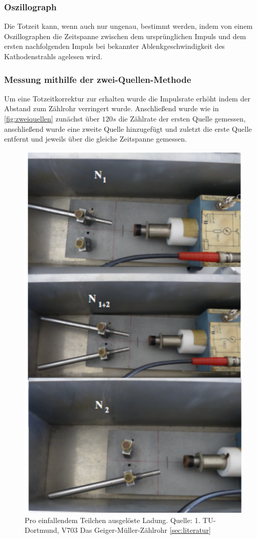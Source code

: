 \subsubsection{Oszillograph}
Die Totzeit kann, wenn auch nur ungenau, bestimmt werden, indem von einem Oszillographen die Zeitspanne 
zwischen dem ursprünglichen Impuls und dem ersten nachfolgenden Impuls bei bekannter Ablenkgeschwindigkeit 
des Kathodenstrahls agelesen wird.
\subsubsection{Messung mithilfe der zwei-Quellen-Methode}
Um eine Totzeitkorrektur zur erhalten wurde die Impulsrate erhöht indem der Abstand zum Zählrohr verringert 
wurde. Anschließend wurde wie in \autoref{fig:zweiquellen} zunächst über $120s$  die Zählrate der ersten Quelle gemessen, anschließend wurde 
eine zweite Quelle hinzugefügt und zuletzt die erste Quelle entfernt und jeweils über die gleiche Zeitspanne 
gemessen.
\begin{figure}
    \centering
    \includegraphics{Zweiquellenmethode.pdf}
    \caption{Pro einfallendem Teilchen ausgelöste Ladung. Quelle: 1. TU-Dortmund, V703 Das Geiger-Müller-Zählrohr
    \autoref{sec:literatur}}
    \label{fig:zweiquellen}
  \end{figure}